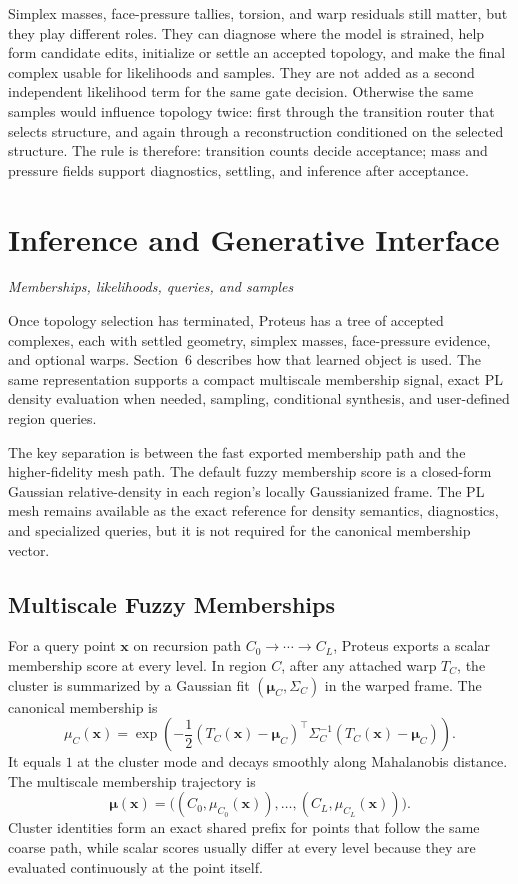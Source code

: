 \documentclass[11pt]{article}
\newcommand{\sectionsubtitle}[1]{\vspace{-0.25em}\noindent\textit{#1}\par\vspace{0.75em}}
\theoremstyle{definition}
\theoremstyle{plain}
\begin{document}
Simplex masses, face-pressure tallies, torsion, and warp residuals still matter, but they play different roles. They can diagnose where the model is strained, help form candidate edits, initialize or settle an accepted topology, and make the final complex usable for likelihoods and samples. They are not added as a second independent likelihood term for the same gate decision. Otherwise the same samples would influence topology twice: first through the transition router that selects structure, and again through a reconstruction conditioned on the selected structure. The rule is therefore: transition counts decide acceptance; mass and pressure fields support diagnostics, settling, and inference after acceptance.

\section{Inference and Generative Interface}
\label{sec:inference}
\sectionsubtitle{Memberships, likelihoods, queries, and samples}

Once topology selection has terminated, Proteus has a tree of accepted complexes, each with settled geometry, simplex masses, face-pressure evidence, and optional warps. Section~6 describes how that learned object is used. The same representation supports a compact multiscale membership signal, exact PL density evaluation when needed, sampling, conditional synthesis, and user-defined region queries.

The key separation is between the fast exported membership path and the higher-fidelity mesh path. The default fuzzy membership score is a closed-form Gaussian relative-density in each region's locally Gaussianized frame. The PL mesh remains available as the exact reference for density semantics, diagnostics, and specialized queries, but it is not required for the canonical membership vector.

\subsection{Multiscale Fuzzy Memberships}
For a query point $\mathbf x$ on recursion path $C_0\to\cdots\to C_L$, Proteus exports a scalar membership score at every level. In region $C$, after any attached warp $T_C$, the cluster is summarized by a Gaussian fit $(\boldsymbol\mu_C,\Sigma_C)$ in the warped frame. The canonical membership is
\[
\mu_C(\mathbf x)=
\exp\!\left(
-\frac12
(T_C(\mathbf x)-\boldsymbol\mu_C)^\top
\Sigma_C^{-1}
(T_C(\mathbf x)-\boldsymbol\mu_C)
\right).
\]
It equals $1$ at the cluster mode and decays smoothly along Mahalanobis distance. The multiscale membership trajectory is
\[
\boldsymbol\mu(\mathbf x)=
\bigl((C_0,\mu_{C_0}(\mathbf x)),\dots,(C_L,\mu_{C_L}(\mathbf x))\bigr).
\]
Cluster identities form an exact shared prefix for points that follow the same coarse path, while scalar scores usually differ at every level because they are evaluated continuously at the point itself.
\end{document}
